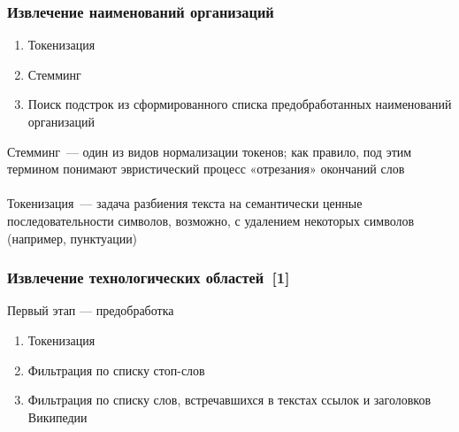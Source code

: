 \documentclass{beamer}
\begin{document}
\begin{frame}\frametitle{Извлечение наименований организаций}
\begin{enumerate}
\item Токенизация
\item Стемминг
\item Поиск подстрок из сформированного списка предобработанных наименований организаций
\end{enumerate}
Стемминг --- один из видов нормализации токенов; как правило, под этим термином понимают эвристический процесс «отрезания» окончаний слов\\~\\
Токенизация --- задача разбиения текста на семантически ценные последовательности символов, возможно, с удалением некоторых символов (например, пунктуации) 
\end{frame}

\begin{frame}\frametitle{Извлечение технологических областей~[1]}
Первый этап --- предобработка
        \begin{enumerate}
		\item Токенизация
		\item Фильтрация по списку стоп-слов
		\item Фильтрация по списку слов, встречавшихся в текстах ссылок и заголовков Википедии
        \end{enumerate}

\end{frame}

\end{document}
